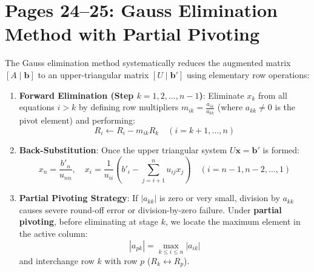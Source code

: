 \section{Pages 24--25: Gauss Elimination Method with Partial Pivoting}
\label{sec:gauss_elimination}

\begin{theorembox}
The Gauss elimination method systematically reduces the augmented matrix $[A \mid \mathbf{b}]$ to an upper-triangular matrix $[U \mid \mathbf{b}']$ using elementary row operations:
\begin{enumerate}
    \item \textbf{Forward Elimination (Step $k = 1, 2, \dots, n-1$)}:
    Eliminate $x_k$ from all equations $i > k$ by defining row multipliers $m_{ik} = \frac{a_{ik}}{a_{kk}}$ (where $a_{kk} \ne 0$ is the pivot element) and performing:
    \begin{equation}
        R_i \leftarrow R_i - m_{ik} R_k \quad (i = k+1, \dots, n)
    \end{equation}
    \item \textbf{Back-Substitution}:
    Once the upper triangular system $U \mathbf{x} = \mathbf{b}'$ is formed:
    \begin{equation}
        x_n = \frac{b'_n}{u_{nn}}, \quad x_i = \frac{1}{u_{ii}}\left( b'_i - \sum_{j=i+1}^n u_{ij} x_j \right) \quad (i = n-1, n-2, \dots, 1)
    \end{equation}
    \item \textbf{Partial Pivoting Strategy}:
    If $|a_{kk}|$ is zero or very small, division by $a_{kk}$ causes severe round-off error or division-by-zero failure. Under \textbf{partial pivoting}, before eliminating at stage $k$, we locate the maximum element in the active column:
    \begin{equation}
        |a_{pk}| = \max_{k \le i \le n} |a_{ik}|
    \end{equation}
    and interchange row $k$ with row $p$ ($R_k \leftrightarrow R_p$).
\end{enumerate}
\end{theorembox}


